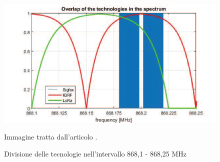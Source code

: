 \documentclass[a4paper]{report} %
\begin{document}
\begin{figure}
	\centering
	\includegraphics[scale=.5]{Immagini/DivB2.png}
	
	\caption{Divisione delle tecnologie nell'intervallo 868,1 - 868,25 MHz} %
	\label{fig:D}
	Immagine tratta dall'articolo \cite{art:rif.46}.
\end{figure}
\end{document}
